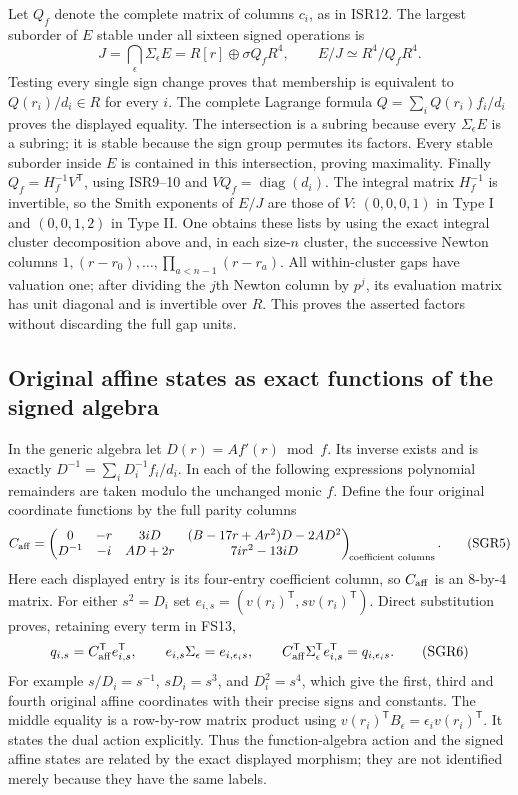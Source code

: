 Let $Q_f$ denote the complete matrix of columns $c_i$, as in ISR12.
The largest suborder of $E$ stable under all sixteen signed operations is
\[
 J=\bigcap_\epsilon\Sigma_\epsilon E
   =R[r]\oplus\sigma Q_fR^4,
 \qquad
 E/J\simeq R^4/Q_fR^4.
 \tag{SGR4}
\]
Testing every single sign change proves that membership is equivalent
to $Q(r_i)/d_i\in R$ for every $i$. The complete Lagrange formula
$Q=\sum_i Q(r_i)f_i/d_i$ proves the displayed equality. The
intersection is a subring because every $\Sigma_\epsilon E$ is a
subring; it is stable because the sign group permutes its factors.
Every stable suborder inside $E$ is contained in this intersection,
proving maximality. Finally $Q_f=H_f^{-1}V^{\mathsf T}$, using
ISR9--10 and $VQ_f=\operatorname{diag}(d_i)$. The integral matrix
$H_f^{-1}$ is invertible, so the Smith exponents of $E/J$ are those
of $V$: $(0,0,0,1)$ in Type I and $(0,0,1,2)$ in Type II.
One obtains these lists by using the exact integral cluster
decomposition above and, in each size-$n$ cluster, the successive
Newton columns $1,(r-r_0),\ldots,\prod_{a<n-1}(r-r_a)$.
All within-cluster gaps have valuation one; after dividing the $j$th
Newton column by $p^j$, its evaluation matrix has unit diagonal and
is invertible over $R$. This proves the asserted factors without
discarding the full gap units.

\subsection{Original affine states as exact functions of the signed algebra}
In the generic algebra let $D(r)=Af'(r)\bmod f$. Its inverse exists
and is exactly $D^{-1}=\sum_i D_i^{-1}f_i/d_i$. In each of the
following expressions polynomial remainders are taken modulo the
unchanged monic $f$. Define the four original coordinate functions by
the full parity columns
\[
 C_{\rm aff}=\begin{pmatrix}
 0&-r&3iD&(B-17r+Ar^2)D-2AD^2\\
 D^{-1}&-i&AD+2r&7ir^2-13iD
 \end{pmatrix}_{\!\text{coefficient columns}}.
 \tag{SGR5}
\]
Here each displayed entry is its four-entry coefficient column, so
$C_{\rm aff}$ is an $8$-by-$4$ matrix. For either $s^2=D_i$ set
$e_{i,s}=(v(r_i)^{\mathsf T},s v(r_i)^{\mathsf T})$. Direct substitution
proves, retaining every term in FS13,
\[
 q_{i,s}=C_{\rm aff}^{\mathsf T}e_{i,s}^{\mathsf T},\qquad
 e_{i,s}\Sigma_\epsilon=e_{i,\epsilon_i s},\qquad
 C_{\rm aff}^{\mathsf T}\Sigma_\epsilon^{\mathsf T}e_{i,s}^{\mathsf T}
   =q_{i,\epsilon_i s}.
 \tag{SGR6}
\]
For example $s/D_i=s^{-1}$, $sD_i=s^3$, and $D_i^2=s^4$,
which give the first, third and fourth original affine coordinates
with their precise signs and constants. The middle equality is a
row-by-row matrix product using $v(r_i)^{\mathsf T}B_\epsilon
=\epsilon_i v(r_i)^{\mathsf T}$. It states the dual action explicitly.
Thus the function-algebra action and the signed affine states are
related by the exact displayed morphism; they are not identified
merely because they have the same labels.

